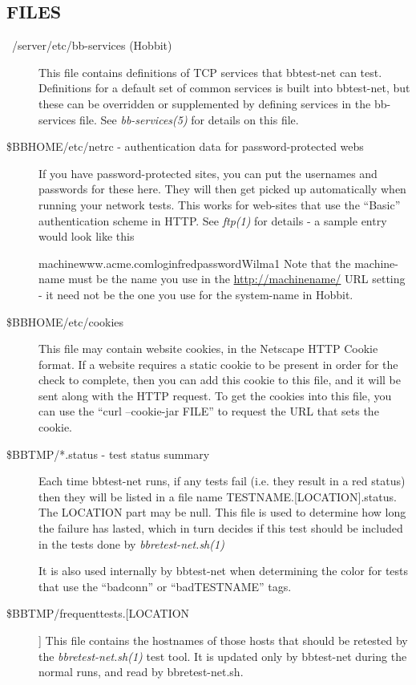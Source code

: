 \subsection{FILES}
\begin{description}
\item[~/server/etc/bb-services (Hobbit)] This file contains
  definitions of TCP services that bbtest-net can test. Definitions
  for a default set of common services is built into bbtest-net, but
  these can be overridden or supplemented by defining services in the
  bb-services file. See \emph{bb-services(5)} for details on this
  file. 


 

\item[\$BBHOME/etc/netrc - authentication data for password-protected
  webs] If you have password-protected sites, you can put the
  usernames and passwords for these here. They will then get picked up
  automatically when running your network tests. This works for
  web-sites that use the ``Basic'' authentication scheme in HTTP. See
  \emph{ftp(1)} for details - a sample entry would look like this  

 
machinewww.acme.comloginfredpasswordWilma1  
 Note that the machine-name must be the name you use in the
 \url{http://machinename/} URL setting - it need not be the one you
 use for the system-name in Hobbit. 


 
\item[\$BBHOME/etc/cookies] This file may contain website cookies, in
  the Netscape HTTP Cookie format. If a website requires a static
  cookie to be present in order for the check to complete, then you
  can add this cookie to this file, and it will be sent along with the
  HTTP request. To get the cookies into this file, you can use the
  ``curl --cookie-jar FILE'' to request the URL that sets the cookie. 


 

\item[\$BBTMP/*.status - test status summary] Each time bbtest-net
  runs, if any tests fail (i.e. they result in a red status) then they
  will be listed in a file name TESTNAME.[LOCATION].status. The
  LOCATION part may be null. This file is used to determine how long
  the failure has lasted, which in turn decides if this test should be
  included in the tests done by \emph{bbretest-net.sh(1)}

 
 It is also used internally by bbtest-net when determining the color
 for tests that use the ``badconn'' or ``badTESTNAME'' tags. 


 

\item[\$BBTMP/frequenttests.[LOCATION]] This file contains the
  hostnames of those hosts that should be retested by the
  \emph{bbretest-net.sh(1)} test tool. It is updated only by
  bbtest-net during the normal runs, and read by bbretest-net.sh. 



\end{description}
